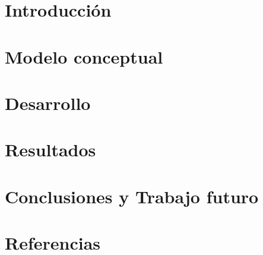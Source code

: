 \documentclass[11pt, a4paper]{article}
\begin{document}

\maketitle
\newpage

\tableofcontents
\newpage

%
\section{Introducción}


\section{Modelo conceptual}


\section{Desarrollo}


\section{Resultados}


\section{Conclusiones y Trabajo futuro}


\section{Referencias}



%
% 
%
\clearpage
\addappheadtotoc
\appendix
\appendixpage


\end{document}
